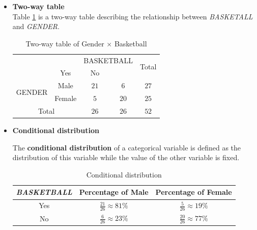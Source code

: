 \documentclass[a4paper, 12pt,twoside]{book}
\begin{document}
\begin{itemize}
\item \textbf{Two-way table}\vspace{0.3cm}\\
Table \ref{Two-way table} is a two-way table describing the relationship between \textit{BASKETALL} and \textit{GENDER}.
\begin{table}[H]
\begin{center}
 \begin{tabular}{c|cccc}
\hline
\multicolumn{2}{c}{}&\multicolumn{2}{c}{BASKETBALL}&\multirow{2}{*}{Total}\\
\hhline{~~--~}
\multicolumn{2}{c}{}&\multicolumn{1}{c}{Yes}&\multicolumn{1}{c}{No}&\\
\multirow{2}{*}{GENDER}&Male&$21$&$6$&$27$\\
&Female&$5$&$20$&$25$\\
\multicolumn{2}{c}{Total}&$26$&$26$&$52$\\
\hline
 \end{tabular}
\caption{Two-way table of Gender $\times$ Basketball}
\label{Two-way table}
\end{center}
\end{table}

\item\textbf{Conditional distribution} \vspace{0.3cm}

 The \textbf{conditional distribution} of a categorical variable is defined as the distribution of this variable while the value of the other variable is fixed. \vspace{0.6cm}

 \begin{table}[H]
  
 \centering
 \begin{tabular}{ccc}
  \vspace{0.2cm}
 \textit{BASKETBALL}&Percentage of Male&Percentage of Female\\
 \hline 
Yes&$\frac{21}{26} \approx 81\%$&$\frac{5}{26} \approx 19\%$\\
  No&$\frac{6}{26} \approx 23\%$&$\frac{20}{26} \approx 77\%$\\
 \hline 
 \end{tabular}
 \caption{Conditional distribution}
 \label{ConditionalDistribution}
 \end{table}
 

\end{itemize}
\end{document}
